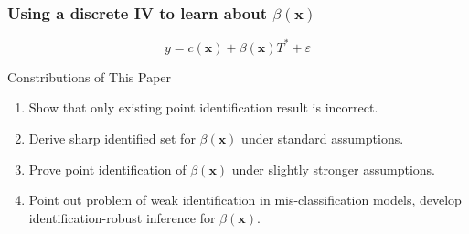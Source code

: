 \documentclass{beamer}
\begin{document}
\begin{frame}
  \frametitle{Using a discrete IV to learn about $\beta(\mathbf{x})$}
 
\[
  y = c(\mathbf{x}) + \beta(\mathbf{x}) T^* + \varepsilon
\]

\begin{alertblock}{Constributions of This Paper}
  \begin{enumerate}
    \item Show that only existing point identification result is incorrect.
    \item Derive sharp identified set for $\beta(\mathbf{x})$ under standard assumptions.
    \item Prove point identification of $\beta(\mathbf{x})$ under slightly stronger assumptions.
    \item Point out problem of weak identification in mis-classification models, develop identification-robust inference for $\beta(\mathbf{x})$. 
  \end{enumerate}
\end{alertblock}


\end{frame}
%
%   
\end{document}

